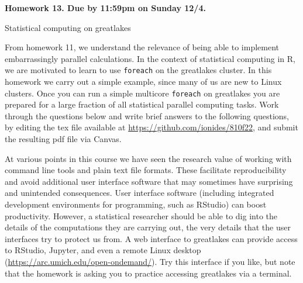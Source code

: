 \documentclass[12pt]{article}
\begin{document}
\begin{center}\bf
Homework 13. Due by 11:59pm on Sunday 12/4.

Statistical computing on greatlakes

\end{center}

From homework 11, we understand the relevance of being able to implement embarrassingly parallel calculations. In the context of statistical computing in R, we are motivated to learn to use \texttt{foreach} on the greatlakes cluster. In this homework we carry out a simple example, since many of us are new to Linux clusters. Once you can run a simple multicore \texttt{foreach} on greatlakes you are prepared for a large fraction of all statistical parallel computing tasks. Work through the questions below and write brief answers to the following questions, by editing the tex file available at \url{https://github.com/ionides/810f22}, and submit the resulting pdf file via Canvas. 

At various points in this course we have seen the research value of working with command line tools and plain text file formats. These facilitate reproducibility and avoid additional user interface software that may sometimes have surprising and unintended consequences. User interface software (including integrated development environments for programming, such as RStudio) can boost productivity. However, a statistical researcher should be able to dig into the details of the computations they are carrying out, the very details that the user interfaces try to protect us from. A web interface to greatlakes can provide access to RStudio, Jupyter, and even a remote Linux desktop (\url{https://arc.umich.edu/open-ondemand/}). Try this interface if you like, but note that the homework is asking you to practice accessing greatlakes via a terminal.
\end{document}

